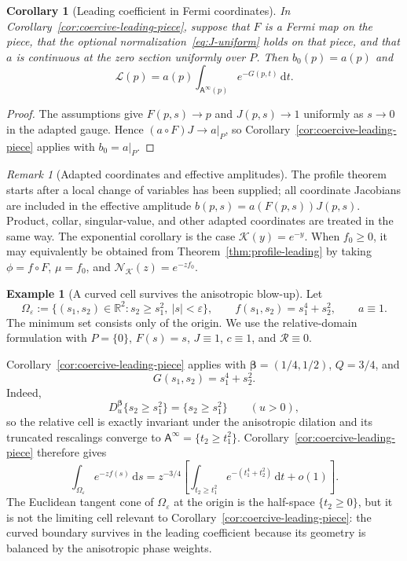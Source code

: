 \documentclass[11pt]{amsart}
\numberwithin{equation}{section}
\newtheorem{corollary}[theorem]{Corollary}
\theoremstyle{definition}
\newtheorem{example}[theorem]{Example}
\theoremstyle{remark}
\newtheorem{remark}[theorem]{Remark}
\newcommand{\R}{\mathbb{R}}
\newcommand{\dd}{\,\mathrm{d}}
\newcommand{\eps}{\varepsilon}
\newcommand{\Afib}{\mathsf{A}}
\newcommand{\cL}{\mathcal{L}}
\begin{document}
\begin{corollary}[Leading coefficient in Fermi coordinates]
\label{cor:fermi-leading-coefficient}
In Corollary~\ref{cor:coercive-leading-piece}, suppose that $F$ is a Fermi map
on the piece, that the optional normalization~\eqref{eq:J-uniform} holds on that
piece, and that $a$ is continuous at the zero section uniformly over $P$.
Then $b_0(p)=a(p)$ and
\[
 \cL(p)=a(p)\int_{\Afib^\infty(p)}e^{-G(p,t)}\dd t.
\]
\end{corollary}

\begin{proof}
The assumptions give $F(p,s)\to p$ and $J(p,s)\to1$ uniformly as
$s\to0$ in the adapted gauge.  Hence
$(a\circ F)J\to a|_P$, so
Corollary~\ref{cor:coercive-leading-piece} applies with $b_0=a|_P$.
\end{proof}

\begin{remark}[Adapted coordinates and effective amplitudes]
The profile theorem starts after a local change of variables has been
supplied; all coordinate Jacobians are included in the effective amplitude
$b(p,s)=a(F(p,s))J(p,s)$.  Product, collar, singular-value, and other adapted
coordinates are treated in the same way.  The exponential corollary is the case
$\mathcal K(y)=e^{-y}$.  When $f_0\ge0$, it may equivalently be obtained from
Theorem~\ref{thm:profile-leading} by taking $\phi=f\circ F$, $\mu=f_0$, and
$\mathcal N_{\mathcal K}(z)=e^{-zf_0}$.
\end{remark}

\begin{example}[A curved cell survives the anisotropic blow-up]
\label{ex:curved-anisotropic-cell}
Let
\[
 \Omega_\eps:=\{(s_1,s_2)\in\R^2:s_2\ge s_1^2,\ |s|<\eps\},
 \qquad
 f(s_1,s_2)=s_1^4+s_2^2,
 \qquad a\equiv1.
\]
The minimum set consists only of the origin.  We use the relative-domain
formulation with $P=\{0\}$, $F(s)=s$, $J\equiv1$, $c\equiv1$, and
$\mathcal R\equiv0$.

Corollary~\ref{cor:coercive-leading-piece} applies with
$\bm\beta=(1/4,1/2)$, $Q=3/4$, and
\[
 G(s_1,s_2)=s_1^4+s_2^2.
\]
Indeed,
\[
 D_u^{\bm\beta}\{s_2\ge s_1^2\}=\{s_2\ge s_1^2\}
 \qquad(u>0),
\]
so the relative cell is exactly invariant under the anisotropic dilation and
its truncated rescalings converge to
$\Afib^\infty=\{t_2\ge t_1^2\}$.
Corollary~\ref{cor:coercive-leading-piece} therefore gives
\[
 \int_{\Omega_\eps}e^{-zf(s)}\dd s
 =z^{-3/4}\left[
 \int_{t_2\ge t_1^2}e^{-(t_1^4+t_2^2)}\dd t+o(1)
 \right].
\]
The Euclidean tangent cone of $\Omega_\eps$ at the origin is the half-space
$\{t_2\ge0\}$, but it is not the limiting cell relevant to
Corollary~\ref{cor:coercive-leading-piece}: the curved boundary survives in
the leading coefficient because its geometry is balanced by the anisotropic
phase weights.
\end{example}
\end{document}
